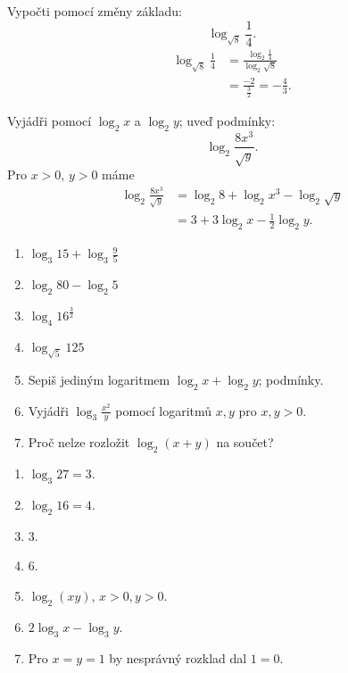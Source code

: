 \documentclass[11pt,a4paper]{article}
\begin{document}
\begin{prikladReseniBox}[title={Příklad 4}]
Vypočti pomocí změny základu:
\[
\log_{\sqrt8}\frac14.
\]
\tcblower
\[
\begin{aligned}
\log_{\sqrt8}\frac14
&=\frac{\log_2\frac14}{\log_2\sqrt8}\\
&=\frac{-2}{\frac32}=-\frac43.
\end{aligned}
\]
\end{prikladReseniBox}
\begin{prikladReseniBox}[title={Příklad 5}]
Vyjádři pomocí $\log_2 x$ a $\log_2 y$; uveď podmínky:
\[
\log_2\frac{8x^3}{\sqrt{y}}.
\]
\tcblower
Pro $x>0$, $y>0$ máme
\[
\begin{aligned}
\log_2\frac{8x^3}{\sqrt{y}}
&=\log_2 8+\log_2 x^3-\log_2\sqrt y\\
&=3+3\log_2 x-\frac12\log_2 y.
\end{aligned}
\]
\end{prikladReseniBox}
\begin{zadaniReseniBox}[title={Samostatná práce 1}]
\begin{enumerate}[label=\alph*)]
\item $\log_3 15+\log_3\frac95$
\item $\log_2 80-\log_2 5$
\item $\log_4 16^{\frac32}$
\item $\log_{\sqrt5}125$
\item Sepiš jediným logaritmem $\log_2x+\log_2y$; podmínky.
\item Vyjádři $\log_3\frac{x^2}{y}$ pomocí logaritmů $x,y$ pro $x,y>0$.
\item Proč nelze rozložit $\log_2(x+y)$ na součet?
\end{enumerate}
\tcblower
\begin{enumerate}[label=\alph*)]
\item $\log_3 27=3$.
\item $\log_2 16=4$.
\item $3$.
\item $6$.
\item $\log_2(xy)$, $x>0,y>0$.
\item $2\log_3x-\log_3y$.
\item Pro $x=y=1$ by nesprávný rozklad dal $1=0$.
\end{enumerate}
\end{zadaniReseniBox}
\end{document}

